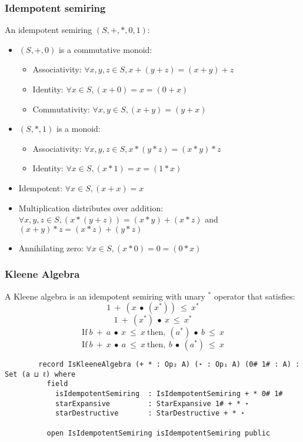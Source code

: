 \documentclass[xcolor={dvipsnames}]{beamer}
\begin{document}
\begin{frame}
  \frametitle{Idempotent semiring}
  An idempotent semiring $(S,+,*,0,1)$:
  \begin{itemize}
    \item $(S,+,0)$ is a commutative monoid:
    \begin{itemize}
      \item Associativity: $\forall x,y,z \in S, x + (y + z) = (x + y) + z$
      \item Identity: $\forall x \in S, (x + 0) = x = (0 + x)$
      \item Commutativity: $\forall x,y \in S, (x + y) = (y + x)$
    \end{itemize}
    \item $(S,*,1)$ is a monoid:
    \begin{itemize}
      \item Associativity: $ \forall x,y,z \in S, x * (y*z)  = (x*y)*z$
      \item Identity: $\forall x \in S, (x * 1) = x = (1 * x)$
    \end{itemize}
    \item Idempotent: $\forall x \in S, (x + x) = x$
    \item Multiplication distributes over addition: \(\forall x , y , z \in S, (x * (y + z)) = (x * y) + (x
    * z)\) and \( (x + y) * z = (x * z) + (y * z) \)
    \item Annihilating zero: \(\forall x \in S, (x * 0) = 0 = (0 * x)\)
    \end{itemize}

\end{frame}

\begin{frame}[fragile]
  \frametitle{Kleene Algebra}

    A Kleene algebra is an idempotent semiring with unary $^{*}$ operator that satisfies:
        \[ 1\ +\ (x\ ∙\ (x^{*}))\ \leq\ x^{*}\]
        \[ 1\ +\ (x^{*})\ ∙\ x\ \leq\ x^{*}\]
        \[\text{If} \ b\ +\ a\  ∙\ x\ \leq\ x\ \text{then},\ (a^{*})\ ∙\ b\ \leq\ x\]
        \[\text{If} \ b\ +\ x\ ∙\ a\ \leq\ x \  \text{then},\ b\ ∙\ (a^{*})\ \leq\ x\]

    \begin{verbatim}
        record IsKleeneAlgebra (+ * : Op₂ A) (⋆ : Op₁ A) (0# 1# : A) : Set (a ⊔ ℓ) where
          field
            isIdempotentSemiring  : IsIdempotentSemiring + * 0# 1#
            starExpansive         : StarExpansive 1# + * ⋆
            starDestructive       : StarDestructive + * ⋆
    
          open IsIdempotentSemiring isIdempotentSemiring public
    \end{verbatim}
\end{frame}
\end{document}
